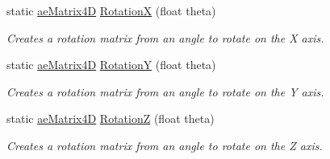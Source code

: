 \begin{DoxyCompactItemize}
static \hyperlink{structae_core_1_1ae_matrix4_d}{ae\+Matrix4D} \hyperlink{structae_core_1_1ae_matrix4_d_ac1dad0847386c020f6fc283f6d9981e1}{RotationX} (float theta)
\begin{DoxyCompactList}\small\item\em Creates a rotation matrix from an angle to rotate on the X axis. \end{DoxyCompactList}\item 
static \hyperlink{structae_core_1_1ae_matrix4_d}{ae\+Matrix4D} \hyperlink{structae_core_1_1ae_matrix4_d_ac90e295627e9218b8a6417890e70a694}{RotationY} (float theta)
\begin{DoxyCompactList}\small\item\em Creates a rotation matrix from an angle to rotate on the Y axis. \end{DoxyCompactList}\item 
static \hyperlink{structae_core_1_1ae_matrix4_d}{ae\+Matrix4D} \hyperlink{structae_core_1_1ae_matrix4_d_a3059eabadc5d9e22436b57a972654719}{RotationZ} (float theta)
\begin{DoxyCompactList}\small\item\em Creates a rotation matrix from an angle to rotate on the Z axis. \end{DoxyCompactList}\end{DoxyCompactItemize}
